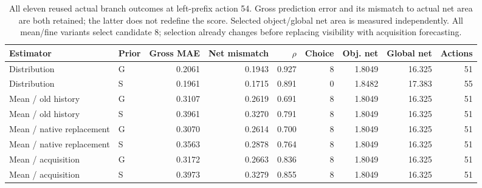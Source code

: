 \begin{table}[!htbp]
\centering\small\setlength{\tabcolsep}{3pt}
\caption{All eleven reused actual branch outcomes at left-prefix action 54. Gross prediction error and its mismatch to actual net area are both retained; the latter does not redefine the score. Selected object/global net area is measured independently. All mean/fine variants select candidate 8; selection already changes before replacing visibility with acquisition forecasting.}
\label{tab:acquisition-fitted}
\begin{tabular}{llrrrrrrr}
\toprule
Estimator & Prior & Gross MAE & Net mismatch & $\rho$ & Choice & Obj. net & Global net & Actions \\
\midrule
Distribution & G & 0.2061 & 0.1943 & 0.927 & 8 & 1.8049 & 16.325 & 51 \\
Distribution & S & 0.1961 & 0.1715 & 0.891 & 0 & 1.8482 & 17.383 & 55 \\
Mean / old history & G & 0.3107 & 0.2619 & 0.691 & 8 & 1.8049 & 16.325 & 51 \\
Mean / old history & S & 0.3961 & 0.3270 & 0.791 & 8 & 1.8049 & 16.325 & 51 \\
Mean / native replacement & G & 0.3070 & 0.2614 & 0.700 & 8 & 1.8049 & 16.325 & 51 \\
Mean / native replacement & S & 0.3563 & 0.2878 & 0.764 & 8 & 1.8049 & 16.325 & 51 \\
Mean / acquisition & G & 0.3172 & 0.2663 & 0.836 & 8 & 1.8049 & 16.325 & 51 \\
Mean / acquisition & S & 0.3973 & 0.3279 & 0.855 & 8 & 1.8049 & 16.325 & 51 \\
\bottomrule
\end{tabular}
\end{table}

